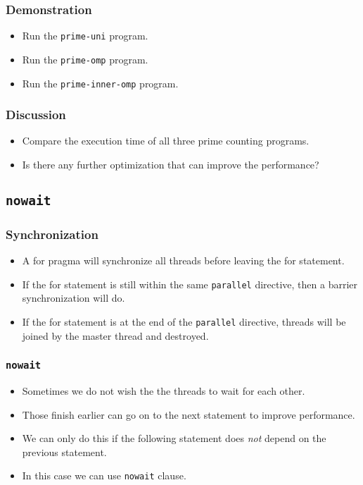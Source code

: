 \documentclass{beamer}
\begin{document}
\begin{frame}
  \frametitle{Demonstration}
  \begin{itemize}
  \item Run the {\tt prime-uni} program.
  \item Run the {\tt prime-omp} program.
  \item Run the {\tt prime-inner-omp} program.
  \end{itemize}
\end{frame}

\begin{frame}
  \frametitle{Discussion}
  \begin{itemize}
  \item Compare the execution time of all three prime counting
    programs.
  \item Is there any further optimization that can improve the
    performance?
  \end{itemize}
\end{frame}

\subsection{\tt nowait}

\begin{frame}
\frametitle{Synchronization}
\begin{itemize}
\item A for pragma will synchronize all threads before leaving the
  for statement.
\item If the for statement is still within the same {\tt parallel}
  directive, then a barrier synchronization will do.
\item If the for statement is at the end of the {\tt parallel}
  directive, threads will be joined by the master thread and
  destroyed.
\end{itemize}
\end{frame}

\begin{frame}
\frametitle{\tt nowait}
\begin{itemize}
\item Sometimes we do not wish the the threads to wait for each other.
\item Those finish earlier can go on to the next statement to improve
  performance.
\item We can only do this if the following statement does {\em not}
  depend on the previous statement.
\item In this case we can use {\tt nowait} clause.
\end{itemize}
\end{frame}
\end{document}
